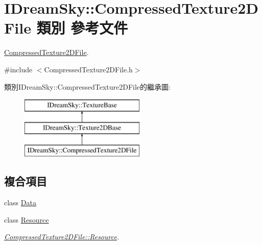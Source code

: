 \hypertarget{class_i_dream_sky_1_1_compressed_texture2_d_file}{}\section{I\+Dream\+Sky\+:\+:Compressed\+Texture2\+D\+File 類別 參考文件}
\label{class_i_dream_sky_1_1_compressed_texture2_d_file}


\hyperlink{class_i_dream_sky_1_1_compressed_texture2_d_file}{Compressed\+Texture2\+D\+File}.  




{\ttfamily \#include $<$Compressed\+Texture2\+D\+File.\+h$>$}

類別\+I\+Dream\+Sky\+:\+:Compressed\+Texture2\+D\+File的繼承圖\+:\begin{figure}[H]
\begin{center}
\leavevmode
\includegraphics[height=3.000000cm]{class_i_dream_sky_1_1_compressed_texture2_d_file}
\end{center}
\end{figure}
\subsection*{複合項目}
\begin{DoxyCompactItemize}
\item 
class \hyperlink{class_i_dream_sky_1_1_compressed_texture2_d_file_1_1_data}{Data}
\item 
class \hyperlink{class_i_dream_sky_1_1_compressed_texture2_d_file_1_1_resource}{Resource}
\begin{DoxyCompactList}\small\item\em \hyperlink{class_i_dream_sky_1_1_compressed_texture2_d_file_1_1_resource}{Compressed\+Texture2\+D\+File\+::\+Resource}. \end{DoxyCompactList}\end{DoxyCompactItemize}
